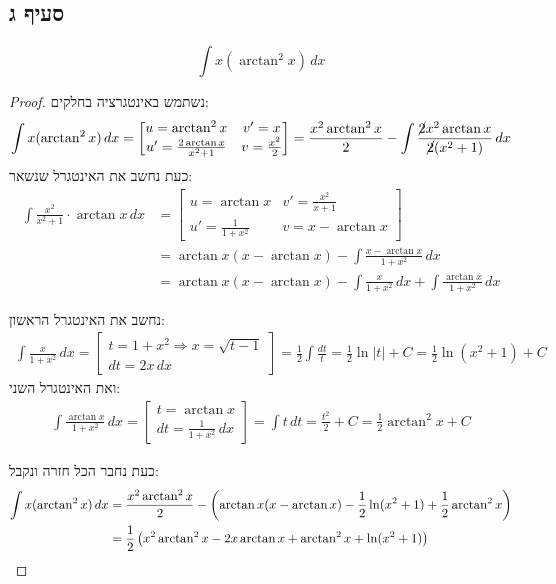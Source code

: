 \documentclass{article}
\begin{document}
	\subsection*{סעיף ג}
	\[
		\int x(\arctan^2 x) \, dx
	\]
	\begin{proof}
	נשתמש באינטגרציה בחלקים:
		\begin{align*}
			\int x(\arctan^2 x) \, dx
			= \begin{bmatrix}
				u = \arctan^2 x & v' = x \\
				u' = \frac{2\arctan x}{x^2 + 1} & v = \frac{x^2}{2}
			\end{bmatrix}
			= \frac{x^2 \arctan^2 x}{2}
			- \int \frac{\cancel{2}x^2 \arctan x}{\cancel{2}(x^2 + 1)} \, dx
		\end{align*}
		כעת נחשב את האינטגרל שנשאר:
		\begin{align*}
			\int \frac{x^2}{x^2 + 1} \cdot \arctan x \, dx
			&= \begin{bmatrix}
				u = \arctan x & v' = \frac{x^2}{x + 1} \\
				u' = \frac{1}{1 + x^2} & v = x - \arctan x
			\end{bmatrix} \\
			&= \arctan x (x - \arctan x)
			- \int \frac{x - \arctan x}{1+x^2} \, dx \\
			&= \arctan x (x - \arctan x)
			- \int \frac{x}{1+x^2} \, dx
			+ \int \frac{\arctan x}{1+x^2} \, dx
		\end{align*}

		נחשב את האינטגרל הראשון:
		\begin{align*}
			\int \frac{x}{1+x^2} \, dx
			= \begin{bmatrix}
				t = 1 + x^2 \Rightarrow x = \sqrt{t - 1} \\
				dt = 2x \, dx
			\end{bmatrix}
			= \frac{1}{2} \int \frac{dt}{t}
			= \frac{1}{2} \ln |t| + C
			= \frac{1}{2} \ln (x^2 + 1) + C
		\end{align*}
		ואת האינטגרל השני:
		\begin{align*}
			\int \frac{\arctan x}{1+x^2} \, dx
			= \begin{bmatrix}
				t = \arctan x \\
				dt = \frac{1}{1+x^2} \, dx
			\end{bmatrix}
			= \int t \, dt = \frac{t^2}{2} + C
			= \frac{1}{2} \arctan^2 x + C
		\end{align*}

		כעת נחבר הכל חזרה ונקבל:
		\begin{align*}
			\int x(\arctan^2 x) \, dx
			&= \frac{x^2 \arctan^2 x}{2} -\left( \arctan x (x - \arctan x) - \frac{1}{2} \ln (x^2 + 1) + \frac{1}{2}\arctan^2 x \right) \\
			&= \frac{1}{2}\left( x^2 \arctan^2 x - 2x \arctan x + \arctan^2 x + \ln(x^2+1) \right)
		\end{align*}
	\end{proof}
\end{document}
